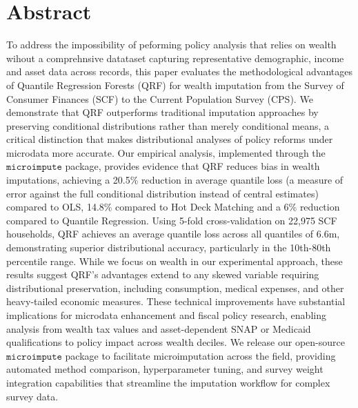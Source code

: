 \section*{Abstract}

To address the impossibility of peforming policy analysis that relies on wealth wihout a comprehnsive datataset capturing representative demographic, income and asset data across records, this paper evaluates the methodological advantages of Quantile Regression Forests (QRF) for wealth imputation from the Survey of Consumer Finances (SCF) to the Current Population Survey (CPS). We demonstrate that QRF outperforms traditional imputation approaches by preserving conditional distributions rather than merely conditional means, a critical distinction that makes distributional analyses of policy reforms under microdata more accurate. Our empirical analysis, implemented through the $\texttt{microimpute}$ package, provides evidence that QRF reduces bias in wealth imputations, achieving a 20.5\% reduction in average quantile loss (a measure of error against the full conditional distribution instead of central estimates) compared to OLS, 14.8\% compared to Hot Deck Matching and a 6\% reduction compared to Quantile Regression. Using 5-fold cross-validation on 22,975 SCF households, QRF achieves an average quantile loss across all quantiles of 6.6m, demonstrating superior distributional accuracy, particularly in the 10th-80th percentile range. While we focus on wealth in our experimental approach, these results suggest QRF's advantages extend to any skewed variable requiring distributional preservation, including consumption, medical expenses, and other heavy-tailed economic measures. These technical improvements have substantial implications for microdata enhancement and fiscal policy research, enabling analysis from wealth tax values and asset-dependent SNAP or Medicaid qualifications to policy impact across wealth deciles. We release our open-source $\texttt{microimpute}$ package to facilitate microimputation across the field, providing automated method comparison, hyperparameter tuning, and survey weight integration capabilities that streamline the imputation workflow for complex survey data.